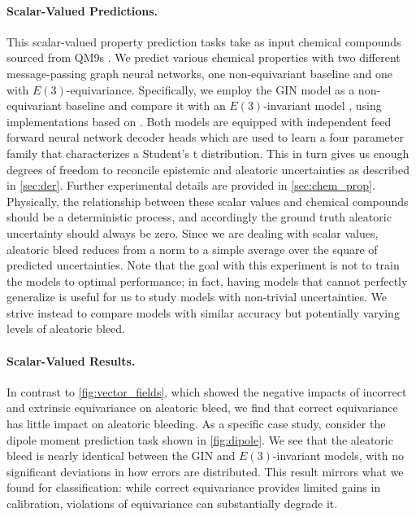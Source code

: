 \documentclass[10pt]{article} %
\theoremstyle{definition}
\begin{document}
\paragraph{Scalar-Valued Predictions.} This scalar-valued property prediction tasks take as input chemical compounds sourced from QM9s \citep{ramakrishnan2014quantum}. We predict various chemical properties with two different message-passing graph neural networks, one non-equivariant baseline and one with $E(3)$-equivariance. Specifically, we employ the GIN model \citep{xu2018powerful} as a non-equivariant baseline and compare it with an $E(3)$-invariant model \citep{batzner20223}, using implementations based on \cite{TeachOpenCADD2023}. Both models are equipped with independent feed forward neural network decoder heads which are used to learn a four parameter family that characterizes a Student's t distribution. This in turn gives us enough degrees of freedom to reconcile epistemic and aleatoric uncertainties as described in \cref{sec:der}. Further experimental details are provided in \cref{sec:chem_prop}. Physically, the relationship between these scalar values and chemical compounds should be a  deterministic process, and accordingly the ground truth aleatoric uncertainty should always be zero. Since we are dealing with scalar values, aleatoric bleed reduces from a norm to a simple average over the square of predicted uncertainties. Note that the goal with this experiment is not to train the models to optimal performance; in fact, having models that cannot perfectly generalize is useful for us to study models with non-trivial uncertainties. We strive instead to compare models with similar accuracy but potentially varying levels of aleatoric bleed.

\paragraph{Scalar-Valued Results.} In contrast to \cref{fig:vector_fields}, which showed the negative impacts of incorrect and extrinsic equivariance on aleatoric bleed, we find that correct equivariance has little impact on aleatoric bleeding. As a specific case study, consider the dipole moment prediction task shown in \cref{fig:dipole}. We see that the aleatoric bleed is nearly identical between the GIN and $E(3)$-invariant models, with no significant deviations in how errors are distributed. This result mirrors what we found for classification: while correct equivariance provides limited gains in calibration, violations of equivariance can substantially degrade it.
\end{document}
